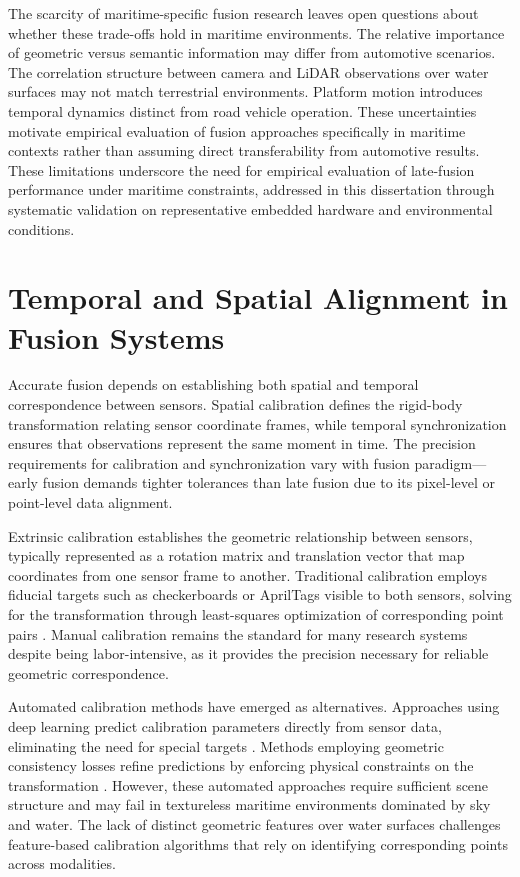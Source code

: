 \documentclass[../main.tex]{subfiles}
\begin{document}
The scarcity of maritime-specific fusion research leaves open questions about whether these trade-offs hold in maritime environments. The relative importance of geometric versus semantic information may differ from automotive scenarios. The correlation structure between camera and LiDAR observations over water surfaces may not match terrestrial environments. Platform motion introduces temporal dynamics distinct from road vehicle operation. These uncertainties motivate empirical evaluation of fusion approaches specifically in maritime contexts rather than assuming direct transferability from automotive results. These limitations underscore the need for empirical evaluation of late-fusion performance under maritime constraints, addressed in this dissertation through systematic validation on representative embedded hardware and environmental conditions.

\section{Temporal and Spatial Alignment in Fusion Systems}

Accurate fusion depends on establishing both spatial and temporal correspondence between sensors. Spatial calibration defines the rigid-body transformation relating sensor coordinate frames, while temporal synchronization ensures that observations represent the same moment in time. The precision requirements for calibration and synchronization vary with fusion paradigm—early fusion demands tighter tolerances than late fusion due to its pixel-level or point-level data alignment.

Extrinsic calibration establishes the geometric relationship between sensors, typically represented as a rotation matrix and translation vector that map coordinates from one sensor frame to another. Traditional calibration employs fiducial targets such as checkerboards or AprilTags visible to both sensors, solving for the transformation through least-squares optimization of corresponding point pairs \cite{zotero-1745}. Manual calibration remains the standard for many research systems despite being labor-intensive, as it provides the precision necessary for reliable geometric correspondence.

Automated calibration methods have emerged as alternatives. Approaches using deep learning predict calibration parameters directly from sensor data, eliminating the need for special targets \cite{iyer2018}. Methods employing geometric consistency losses refine predictions by enforcing physical constraints on the transformation \cite{yuan2020, xiao2024, shi2020}. However, these automated approaches require sufficient scene structure and may fail in textureless maritime environments dominated by sky and water. The lack of distinct geometric features over water surfaces challenges feature-based calibration algorithms that rely on identifying corresponding points across modalities.
\end{document}
